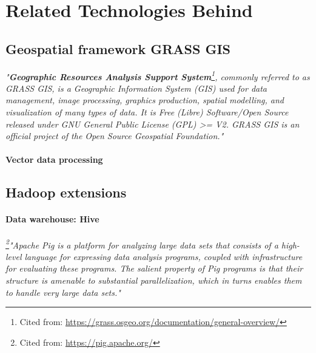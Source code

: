 \documentclass[a4paper,12pt,oneside]{report}
\begin{document}
	
\section{Related Technologies Behind}
	\subsection{Geospatial framework GRASS GIS}

\textit{"\textbf{Geographic Resources Analysis Support System}\footnote{Cited from:
 \url{https://grass.osgeo.org/documentation/general-overview/}}, 
commonly referred to as GRASS GIS, is a Geographic Information System (GIS) used for
 data management, image processing, graphics production, 
spatial modelling, and visualization of many types of data. It is Free (Libre) Software/Open
 Source released under GNU General Public License 
(GPL) >= V2. GRASS GIS is an official project of the Open Source Geospatial Foundation."}

\paragraph{Vector data processing} 


	\subsection{Hadoop extensions}
	\label{sub:hextensions}
	\paragraph{Data warehouse: Hive}
\textit{\footnote{Cited from: \url{https://pig.apache.org/}}"Apache Pig is a platform for analyzing 
large data sets that consists of a high-level language for expressing data analysis programs, coupled 
with infrastructure for evaluating these programs. The salient property of Pig programs is that their 
structure is amenable to substantial parallelization, which in turns enables them to handle very large data sets."}
\end{document}
